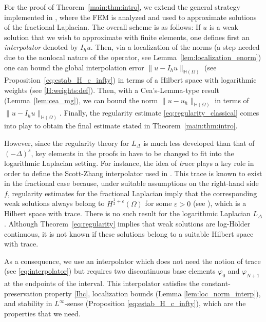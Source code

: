 \documentclass[11 pt]{article}
\numberwithin{equation}{section}
\def\eps{\varepsilon}
\begin{document}
 For the proof of Theorem~\ref{main:thm:intro}, we extend the general strategy implemented in \cite{Bor17}, where the FEM is analyzed and used to approximate solutions of the fractional Laplacian.  The overall scheme is as follows: If $u$ is a weak solution that we wish to approximate with finite elements, one defines first an \emph{interpolator} denoted by $I_h u$.  Then, via a localization of the norms (a step needed due to the nonlocal nature of the operator, see Lemma~\ref{lem:localization_enorm}) one can bound the global interpolation error $\|u-I_h u\|_{\mathbb H(\Omega)}$ (see Proposition~\ref{eq:estab_H_c_infty}) in terms of a Hilbert space with logarithmic weights (see \eqref{H:weights:def}).  Then, with a Cea's-Lemma-type result (Lemma~\ref{lem:cea_mg}), we can bound the norm $\|u-u_h\|_{\mathbb H(\Omega)}$ in terms of $\|u-I_h u\|_{\mathbb H(\Omega)}$.  Finally, the regularity estimate \eqref{eq:regularity_classical} comes into play to obtain the final estimate stated in Theorem~\ref{main:thm:intro}.

 However, since the regularity theory for $L_\Delta$ is much less developed than that of $(-\Delta)^s$, key elements in the proofs in \cite{Bor17} have to be changed to fit into the logarithmic Laplacian setting.  For instance, the idea of \emph{trace} plays a key role in order to define the Scott-Zhang interpolator used in \cite{Bor17}. This trace is known to exist in the fractional case because, under suitable assumptions on the right-hand side $f$, regularity estimates for the fractional Laplacian imply that the corresponding weak solutions always belong to $H^{\frac{1}{2}+\eps}(\Omega)$ for some $\eps>0$ (see \cite[Theorem 2.3.6]{Bor17}), which is a Hilbert space with trace.  There is no such result for the logarithmic Laplacian $L_\Delta$.  Although Theorem~\ref{eq:regularity} implies that weak solutions are log-Hölder continuous, it is not known if these solutions belong to a suitable Hilbert space with trace.

 As a consequence, we use an interpolator which does not need the notion of trace (see \eqref{eq:interpolator}) but requires two discontinuous base elements $\varphi_0$ and $\varphi_{N+1}$ at the endpoints of the interval. This interpolator satisfies the constant-preservation property \eqref{Ihc}, localization bounds (Lemma \ref{lem:loc_norm_interp}), and stability in \(L^{\infty}\)-sense (Proposition \ref{eq:estab_H_c_infty}), which are the properties that we need.
\end{document}
